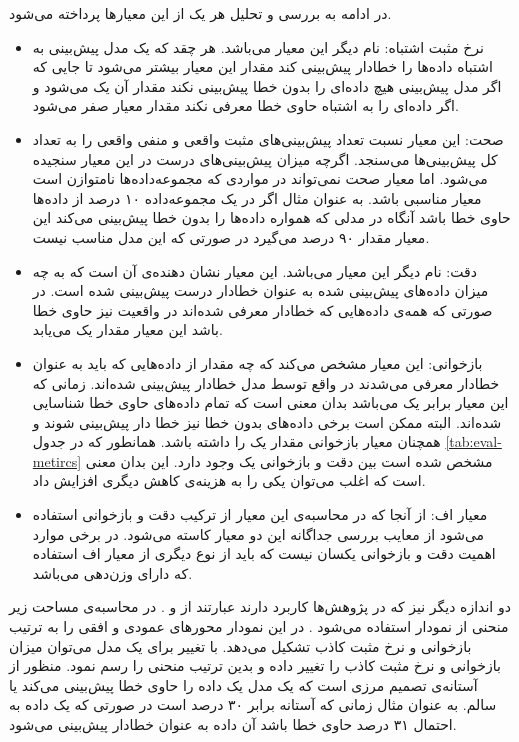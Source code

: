 در ادامه به بررسی و تحلیل هر یک از این معیارها پرداخته می‌شود. 
\begin{itemize}
	\item 
	نرخ مثبت اشتباه: نام دیگر این معیار  می‌باشد. هر چقد که یک مدل پیش‌بینی به اشتباه داده‌ها را خطادار پیش‌بینی کند مقدار این معیار بیشتر می‌شود تا جایی که اگر مدل پیش‌بینی هیچ داده‌ای را بدون خطا پیش‌بینی نکند مقدار آن یک می‌شود و اگر داده‌ای را به اشتباه حاوی خطا معرفی نکند مقدار معیار صفر می‌شود. 
\item 
صحت: این معیار نسبت تعداد پیش‌بینی‌های مثبت واقعی و منفی واقعی را به تعداد کل پیش‌بینی‌ها می‌سنجد. اگرچه میزان پیش‌بینی‌های درست در این معیار سنجیده می‌شود. اما معیار صحت نمی‌تواند در مواردی که مجموعه‌داده‌ها نا‌متوازن است معیار مناسبی باشد. به عنوان مثال اگر در یک مجموعه‌داده ۱۰ درصد از داده‌ها حاوی خطا باشد آنگاه  در مدلی که همواره داده‌ها را بدون خطا پیش‌بینی می‌کند این معیار مقدار ۹۰ درصد می‌گیرد در صورتی که این مدل مناسب نیست. 
\item
دقت: نام دیگر این معیار  می‌باشد. این معیار نشان دهنده‌ی آن است که به چه میزان داده‌های پیش‌بینی شده به عنوان خطادار درست پیش‌بینی شده است.  در صورتی که همه‌ی داده‌هایی که خطادار معرفی شده‌اند در واقعیت نیز حاوی خطا باشد این معیار مقدار یک می‌یابد. 
\item 
بازخوانی: این معیار مشخص می‌کند که چه مقدار از داده‌هایی که باید به عنوان خطادار معرفی می‌شدند در واقع توسط مدل خطادار پیش‌بینی شده‌اند.  زمانی که این معیار برابر یک می‌باشد بدان معنی است که تمام داده‌‌های حاوی خطا شناسایی شده‌اند. البته ممکن است برخی داده‌های بدون خطا نیز خطا دار پیش‌بینی شوند و همچنان معیار بازخوانی مقدار یک را داشته باشد. همانطور که در جدول \ref{tab:eval-metircs} مشخص شده ‌است بین دقت و بازخوانی یک  وجود دارد. این بدان معنی است که اغلب می‌توان یکی را به هزینه‌ی کاهش دیگری افزایش داد. 
\item
معیار اف: از آنجا که در محاسبه‌ی این معیار از ترکیب دقت و بازخوانی استفاده می‌شود از معایب بررسی جداگانه این دو معیار کاسته می‌شود. در برخی موارد اهمیت دقت و بازخوانی یکسان نیست که باید از نوع دیگری از معیار اف استفاده که دارای وزن‌دهی می‌باشد. 
\end{itemize}





دو اندازه دیگر نیز که در پژوهش‌ها کاربرد دارند عبارتند از  و . در محاسبه‌ی مساحت زیر منحنی از  نمودار  استفاده می‌شود . در این نمودار محورهای عمودی و افقی را به ترتیب بازخوانی و  نرخ مثبت کاذب تشکیل می‌دهد.  با تغییر  برای یک مدل می‌توان میزان بازخوانی و  نرخ مثبت کاذب را تغییر داده و بدین ترتیب منحنی را رسم نمود.  منظور از آستانه‌ی تصمیم  مرزی است  که یک مدل یک داده را حاوی خطا پیش‌بینی می‌کند یا سالم. به عنوان مثال زمانی که آستانه برابر ۳۰ درصد است در صورتی که یک داده به احتمال ۳۱ درصد حاوی خطا باشد آن داده به عنوان خطادار پیش‌بینی می‌شود. \\

